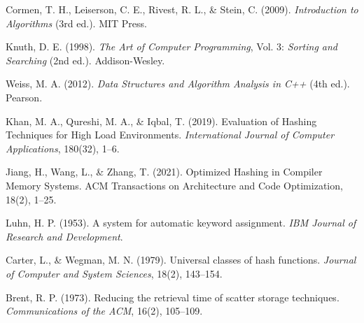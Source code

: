 \documentclass[12pt,a4paper]{report}
\begin{document}
\newpage
{}
{}
\begin{thebibliography}{9}

Cormen, T. H., Leiserson, C. E., Rivest, R. L., \& Stein, C. (2009). \textit{Introduction to Algorithms} (3rd ed.). MIT Press.

Knuth, D. E. (1998). \textit{The Art of Computer Programming}, Vol. 3: \textit{Sorting and Searching} (2nd ed.). Addison-Wesley.

Weiss, M. A. (2012). \textit{Data Structures and Algorithm Analysis in C++} (4th ed.). Pearson.

Khan, M. A., Qureshi, M. A., \& Iqbal, T. (2019). Evaluation of Hashing Techniques for High Load Environments. \textit{International Journal of Computer Applications}, 180(32), 1–6.

Jiang, H., Wang, L., \& Zhang, T. (2021). Optimized Hashing in Compiler Memory Systems. ACM Transactions on Architecture and Code Optimization, 18(2), 1–25.

Luhn, H. P. (1953). A system for automatic keyword assignment. \textit{IBM Journal of Research and Development}.

Carter, L., \& Wegman, M. N. (1979). Universal classes of hash functions. \textit{Journal of Computer and System Sciences}, 18(2), 143–154.

Brent, R. P. (1973). Reducing the retrieval time of scatter storage techniques. \textit{Communications of the ACM}, 16(2), 105–109.

\end{thebibliography}
\end{document}
